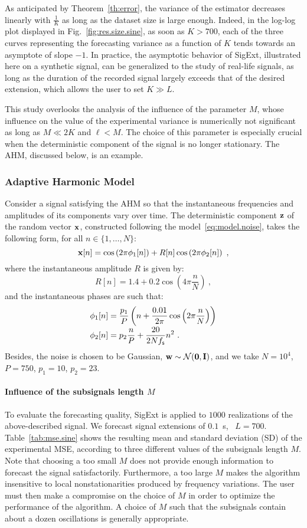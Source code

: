 As anticipated by Theorem~\ref{th:error}, the variance of the estimator decreases linearly with $\frac1K$ as long as the dataset size is large enough. Indeed, in the log-log plot displayed in Fig.~\ref{fig:res.size.sine}, as soon as $K>700$, each of the three curves representing the forecasting variance as a function of $K$ tends towards an asymptote of slope $-1$. 
%
{\color{red}
In practice, the asymptotic behavior of {\sf SigExt}, illustrated here on a synthetic signal, can be generalized to the study of real-life signals, as long as the duration of the recorded signal largely exceeds that of the desired extension, which allows the user to set $K\gg L$.
}


This study overlooks the analysis of the influence of the parameter $M$, whose influence on the value of the experimental variance is numerically not significant as long as $M\ll 2K$ and $\ell<M$. The choice of this parameter is especially crucial when the deterministic component of the signal is no longer stationary. The AHM, discussed below, is an example.

\subsubsection{Adaptive Harmonic Model}
\label{ssse:res.ahm}
Consider a signal satisfying the AHM so that the instantaneous frequencies and amplitudes of its components vary over time. The deterministic component ${\mathbf z}$ of the random vector ${\mathbf x}$, constructed following the model~\eqref{eq:model.noise}, takes the following form, for all $n\in\{1,\ldots,N\}$:
\[
{\mathbf x}[n] = \cos\left(2\pi \phi_1[n] \right) + R[n]\cos\left(2\pi \phi_2[n] \right) \ ,
\] 
where the instantaneous amplitude $R$ is given by:
\[
R[n] = 1.4 + 0.2\cos\left(4\pi\frac{n}{N}\right)\ ,
\]
and the instantaneous phases are such that:
\begin{align*}
\phi_1[n] &= \frac{p_1}{P}\left( n + \frac{0.01}{2\pi}\cos\left(2\pi\frac{n}{N}\right) \right) \\[-1mm]
\phi_2[n] & = p_2\frac{n}{P} + \frac{20}{2Nf_{\mathsf s}}n^2\ .
\end{align*}
Besides, the noise is chosen to be Gaussian, ${\mathbf w}\sim{\mathcal N}(\boldsymbol{0},{\mathbf I})$, and we take $N=10^4$, $P=750$, $p_1=10$, $p_2=23$.

{\color{red}
\paragraph{Influence of the subsignals length $M$}
To evaluate the forecasting quality, {\sf SigExt} is applied to $1000$ realizations of the above-described signal. We forecast signal extensions of $0.1$~s, \ie~$L=700$. Table~\ref{tab:mse.sine} shows the resulting mean and standard deviation (SD) of the experimental MSE, according to three different values of the subsignals length $M$. Note that choosing a too small $M$ does not provide enough information to forecast the signal satisfactorily. Furthermore, a too large $M$ makes the algorithm insensitive to local nonstationarities produced by frequency variations. The user must then make a compromise on the choice of $M$ in order to optimize the performance of the algorithm. A choice of $M$ such that the subsignals contain about a dozen oscillations is generally appropriate.
}

